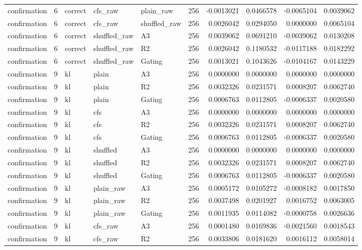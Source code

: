 \begin{tabular}{lrlllrrrrr}
confirmation & 6 & correct & cfs_raw & plain_raw & 256 & -0.0013021 & 0.0466578 & -0.0065104 & 0.0039062 \\
confirmation & 6 & correct & cfs_raw & shuffled_raw & 256 & 0.0026042 & 0.0294050 & 0.0000000 & 0.0065104 \\
confirmation & 6 & correct & shuffled_raw & A3 & 256 & 0.0039062 & 0.0691210 & -0.0039062 & 0.0130208 \\
confirmation & 6 & correct & shuffled_raw & R2 & 256 & 0.0026042 & 0.1180532 & -0.0117188 & 0.0182292 \\
confirmation & 6 & correct & shuffled_raw & Gating & 256 & 0.0013021 & 0.1043626 & -0.0104167 & 0.0143229 \\
confirmation & 9 & kl & plain & A3 & 256 & 0.0000000 & 0.0000000 & 0.0000000 & 0.0000000 \\
confirmation & 9 & kl & plain & R2 & 256 & 0.0032326 & 0.0231571 & 0.0008207 & 0.0062740 \\
confirmation & 9 & kl & plain & Gating & 256 & 0.0006763 & 0.0112805 & -0.0006337 & 0.0020580 \\
confirmation & 9 & kl & cfs & A3 & 256 & 0.0000000 & 0.0000000 & 0.0000000 & 0.0000000 \\
confirmation & 9 & kl & cfs & R2 & 256 & 0.0032326 & 0.0231571 & 0.0008207 & 0.0062740 \\
confirmation & 9 & kl & cfs & Gating & 256 & 0.0006763 & 0.0112805 & -0.0006337 & 0.0020580 \\
confirmation & 9 & kl & shuffled & A3 & 256 & 0.0000000 & 0.0000000 & 0.0000000 & 0.0000000 \\
confirmation & 9 & kl & shuffled & R2 & 256 & 0.0032326 & 0.0231571 & 0.0008207 & 0.0062740 \\
confirmation & 9 & kl & shuffled & Gating & 256 & 0.0006763 & 0.0112805 & -0.0006337 & 0.0020580 \\
confirmation & 9 & kl & plain_raw & A3 & 256 & 0.0005172 & 0.0105272 & -0.0008182 & 0.0017850 \\
confirmation & 9 & kl & plain_raw & R2 & 256 & 0.0037498 & 0.0201927 & 0.0016752 & 0.0063005 \\
confirmation & 9 & kl & plain_raw & Gating & 256 & 0.0011935 & 0.0114082 & -0.0000758 & 0.0026636 \\
confirmation & 9 & kl & cfs_raw & A3 & 256 & 0.0001480 & 0.0169836 & -0.0021560 & 0.0018543 \\
confirmation & 9 & kl & cfs_raw & R2 & 256 & 0.0033806 & 0.0181620 & 0.0016112 & 0.0058014 \\

\end{tabular}
